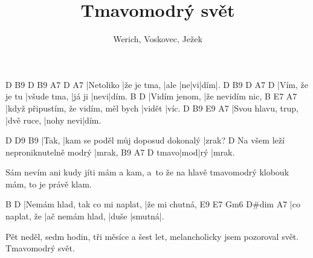 \documentclass{song}
\title{Tmavomodrý svět}
\author{Werich, Voskovec, Ježek}
\begin{document}
\strophe
D         B9          D    B9 A7 D   A7
|Netoliko |že je tma, |ale |ne|vi|dím|.
D              B9          D      A7   D
|Vím, že je tu |všude tma, |já ji |nevi|dím.
B             D
|Vidím jenom, |že nevidím nic,
B                                   E7     A7
|když připustím, že vidím, měl bych |vidět |víc.
D                  B9         E9        A7
|Svou hlavu, trup, |dvě ruce, |nohy nevi|dím.
\endstrophe

D     D9                                 B9
|Tak, |kam se poděl můj doposud dokonalý |zrak?
                                   D
Na všem leží neproniknutelně modrý |mrak,
     B9  A7  D
tmavo|mod|rý |mrak.
\endstrophe

Sám nevím ani kudy jíti mám a kam,
a~to že na hlavě tmavomodrý klobouk mám,
to je právě klam.
\endstrophe

\strophe
B                              D
|Nemám hlad, tak co mi naplat, |že mi chutná,
E9             E7              Gm6   D#dim  A7
|co naplat, že |ač nemám hlad, |duše |smutná|.
\endstrophe

Pět neděl, sedm hodin, tři měsíce a šest let,
melancholicky jsem pozoroval svět.
Tmavomodrý svět.
\endstrophe

\end{document}
